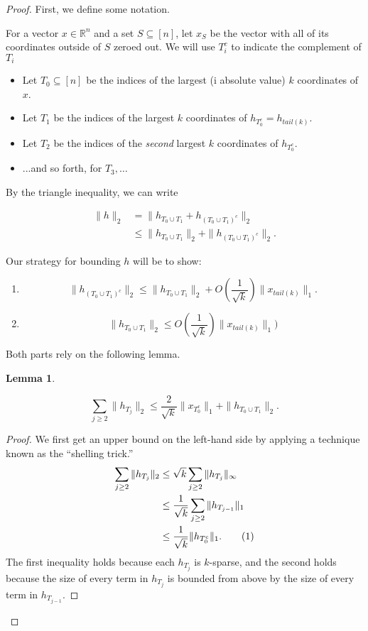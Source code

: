 \documentclass[11pt]{article}
\newcommand{\R}{\mathbb{R}}
\newcommand\numberthis{\addtocounter{equation}{1}\tag{\theequation}}
\newtheorem{lemma}[theorem]{Lemma}
\begin{document}
\begin{proof}
First, we define some notation. 

For a vector $x \in \R^n$ and a set $S \subseteq [n]$, let $x_S$ be 
the vector with all of its coordinates outside of $S$ zeroed out. 
We will use $T_i^c$ to indicate the complement of $T_i$

\begin{itemize}
	\item Let $T_0 \subseteq [n]$ be the indices of the largest (i
	absolute value) $k$ coordinates of $x$.
	\item Let $T_1$ be the indices of the largest $k$ coordinates of 
	$h_{T_0^c} = h_{tail(k)}$.
	\item Let $T_2$ be the indices of the \emph{second} largest $k$ 
	coordinates of $h_{T_0^c}$.
	\item ...and so forth, for $T_3, \dots$
\end{itemize}

By the triangle inequality, we can write

\begin{align*}
	\|h\|_2 &= \|h_{T_0 \cup T_1} + h_{(T_0 \cup T_1)^c}\|_2 \\
	& \le \|h_{T_0 \cup T_1}\|_2 + \|h_{(T_0 \cup T_1)^c}\|_2.
\end{align*}

Our strategy for bounding $h$ will be to show:

\begin{enumerate}
	\item \[\|h_{(T_0 \cup T_1)^c}\|_2 \le \|h_{T_0 \cup T_1}\|_2 + O
	\left(\frac{1}{\sqrt{k}}\right)\|x_{tail(k)}\|_1.\]
	\item \[\|h_{T_0 \cup T_1}\|_2 \le O\left(\frac{1}{\sqrt{k}}
	\right)\|x_{tail(k)}\|_1)\]
\end{enumerate}

Both parts rely on the following lemma.

\begin{lemma}\label{claim:maincalc}

	\[\sum_{j \ge 2} \|h_{T_j}\|_2 \le \frac{2}{\sqrt{k}} \|x_{T_0^c}
	\|_1 + \|h_{T_0\cup T_1}\|_2.\]

\end{lemma}

\begin{proof}
We first get an upper bound on the left-hand side by applying a 
technique known as the ``shelling trick.''
\begin{align*}
	\sum_{j \ge 2} \|h_{T_j}\|_2  &\le \sqrt{k} \sum_{j \ge 2} \|
	h_{T_j}\|_\infty  \\
	& \le \frac{1}{\sqrt{k}} \sum_{j \ge 2} \|h_{T_{j-1}}\|_1 \\
	&\le \frac{1}{\sqrt{k}} \|h_{T_0^c}\|_1. \numberthis
	\label{eq:maincalclhs}
\end{align*}
The first inequality holds because each $h_{T_j}$ is $k$-sparse, and 
the second holds because the size of every term in $h_{T_j}$ is 
bounded from above by the size of every term in $h_{T_{j-1}}$.


\end{proof}
\end{proof}
\end{document}

